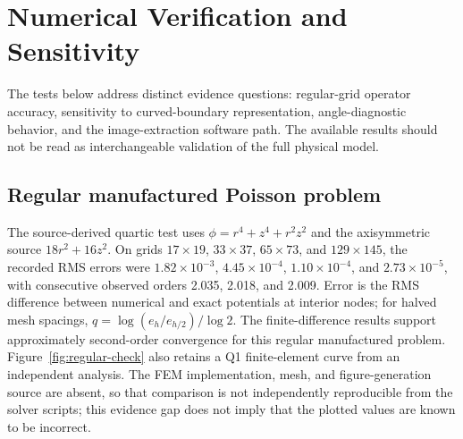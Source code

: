 \section{Numerical Verification and Sensitivity}\label{sec:completed-verification}

The tests below address distinct evidence questions: regular-grid operator accuracy, sensitivity to curved-boundary representation, angle-diagnostic behavior, and the image-extraction software path. The available results should not be read as interchangeable validation of the full physical model.

\subsection{Regular manufactured Poisson problem}
The source-derived quartic test uses $\phi=r^4+z^4+r^2z^2$ and the axisymmetric source $18r^2+16z^2$. On grids $17\times19$, $33\times37$, $65\times73$, and $129\times145$, the recorded RMS errors were $1.82\times10^{-3}$, $4.45\times10^{-4}$, $1.10\times10^{-4}$, and $2.73\times10^{-5}$, with consecutive observed orders 2.035, 2.018, and 2.009. Error is the RMS difference between numerical and exact potentials at interior nodes; for halved mesh spacings, $q=\log(e_h/e_{h/2})/\log 2$. The finite-difference results support approximately second-order convergence for this regular manufactured problem. Figure~\ref{fig:regular-check} also retains a Q1 finite-element curve from an independent analysis. The FEM implementation, mesh, and figure-generation source are absent, so that comparison is not independently reproducible from the solver scripts; this evidence gap does not imply that the plotted values are known to be incorrect.

